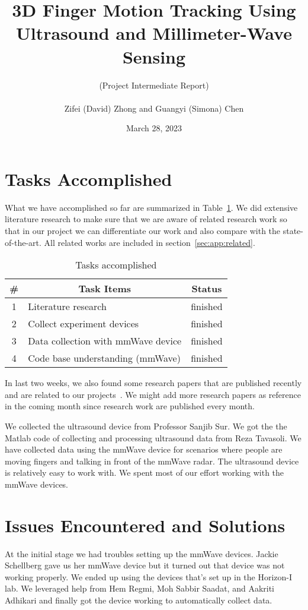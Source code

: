 \documentclass[11pt, oneside]{article}   	%
\title{3D Finger Motion Tracking Using Ultrasound and Millimeter-Wave Sensing}
\author{(Project Intermediate Report)\\ \\Zifei (David) Zhong and Guangyi (Simona) Chen}
\date{March 28, 2023}							%
\begin{document}
\maketitle

\section{Tasks Accomplished}
What we have accomplished so far are summarized in Table~\ref{tab:accomplished}. We did extensive literature research to make sure that we are aware of related research work so that in our project we can differentiate our work and also compare with the state-of-the-art. All related works are included in section~\ref{sec:app:related}.

\begin{table}[ht]
\centering
\caption{Tasks accomplished}
\label{tab:accomplished}
\vspace{4pt}
\begin{tabular}{|c|l|c|}
\hline
\# & \multicolumn{1}{|c|}{Task Items} & Status  \\
\hline
\hline
1 & Literature research & finished\\
\hline
2 & Collect experiment devices & finished \\ 
\hline
3 & Data collection with mmWave device & finished\\
\hline
4 & Code base understanding (mmWave) & finished \\
\hline
\end{tabular}
\end{table}

In last two weeks, we also found some research papers that are published recently and are related to our projects~\cite{ref:mmmic23}. We might add more research papers as reference in the coming month since research work are published every month.

We collected the ultrasound device from Professor Sanjib Sur. We got the the Matlab code of collecting and processing ultrasound data from Reza Tavasoli. We have collected data using the mmWave device for scenarios where people are moving fingers and talking in front of the mmWave radar. The ultrasound device is relatively easy to work with. We spent most of our effort working with the mmWave devices.

\section{Issues Encountered and Solutions}
At the initial stage we had troubles setting up the mmWave devices. Jackie Schellberg gave us her mmWave device but it turned out that device was not working properly. We ended up using the devices that's set up in the Horizon-I lab. We leveraged help from Hem Regmi, Moh Sabbir Saadat, and Aakriti Adhikari and finally got the device working to automatically collect data.
\end{document}
